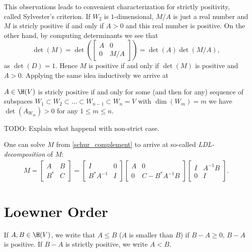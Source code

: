 This observations leads to convenient characterization for strictly positivity, called Sylvester's criterion. If $W_{2}$ is $1$-dimensional, $M/A$ is just a real number and $M$ is stricly positive if and only if $A > 0$ and this real number is positive. On the other hand, by computing determinants we see that
\[
	\det(M) = \det \left(
	\begin{bmatrix}
		A & 0 \\
		0 & M/A
	\end{bmatrix}
	\right)
	=
	\det(A) \det(M/A),
\]
as $\det(D) = 1$. Hence $M$ is positive if and only if $\det(M)$ is positive and $A > 0$. Applying the same idea inductively we arrive at
\begin{lause}
	$A \in \H(V)$ is stricly positive if and only for some (and then for any) sequence of subspaces $W_{1} \subset W_{2} \subset \ldots \subset W_{n - 1} \subset W_{n} = V$ with $\dim(W_{m}) = m$ we have $\det(A_{W_{m}}) > 0$ for any $1 \leq m \leq n$.
\end{lause}

TODO: Explain what happend with non-strict case.

One can solve $M$ from \ref{schur_complement} to arrive at so-called \textit{LDL-decomposition} of $M$:
\begin{align}\label{ldl_decomposition}
	M =
	\begin{bmatrix}
		A & B \\
		B^{*} & C
	\end{bmatrix}
	=
	\begin{bmatrix}
		I & 0 \\
		B^{*} A^{-1}  & I
	\end{bmatrix}
	\begin{bmatrix}
		A & 0 \\
		0 & C - B^{*} A^{-1} B
	\end{bmatrix}
	\begin{bmatrix}
		I & A^{-1} B \\
		0 & I
	\end{bmatrix}.
\end{align}

\section{Loewner Order}

\begin{maar}
	If $A, B \in \H(V)$, we write that $A \leq B$ ($A$ is smaller than $B$) if $B - A \geq 0$, $B - A$ is positive. If $B - A$ is strictly positive, we write $A < B$.
\end{maar}

